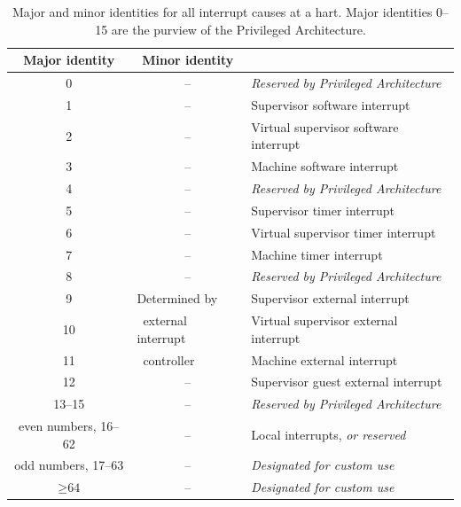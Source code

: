 \begin{table}[h!]
\begin{center}
\begin{tabular}{|c|c|l|}
\hline
Major identity & Minor identity & \\
\hline
\hline
0              & --             & \em Reserved by Privileged Architecture \\
\hline
1              & --             & Supervisor software interrupt \\
2              & --             & Virtual supervisor software interrupt \\
3              & --             & Machine software interrupt \\
\hline
4              & --             & \em Reserved by Privileged Architecture \\
\hline
5              & --             & Supervisor timer interrupt \\
6              & --             & Virtual supervisor timer interrupt \\
7              & --             & Machine timer interrupt \\
\hline
8              & --             & \em Reserved by Privileged Architecture \\
\hline
9              & \multicolumn{1}{l|}{Determined by}
                                & Supervisor external interrupt \\
10             & \multicolumn{1}{l|}{\ external interrupt}
                                & Virtual supervisor external interrupt \\
11             & \multicolumn{1}{l|}{\ controller}
                                & Machine external interrupt \\
\hline
12                   & -- & Supervisor guest external interrupt \\
13--15               & -- & \em Reserved by Privileged Architecture \\
\hline
\hline
even numbers, 16--62 & -- & Local interrupts, \emph{or reserved} \\
odd numbers, 17--63  & -- & \em Designated for custom use \\
\hline
$\geq \mbox{64}$     & -- & \em Designated for custom use \\
\hline
\end{tabular}
\end{center}
\caption{%
Major and minor identities for all interrupt causes at a hart.
Major identities 0--15 are the purview of the {\RISCV} Privileged
Architecture.%
}
\label{tab:interruptIdents}
\end{table}


